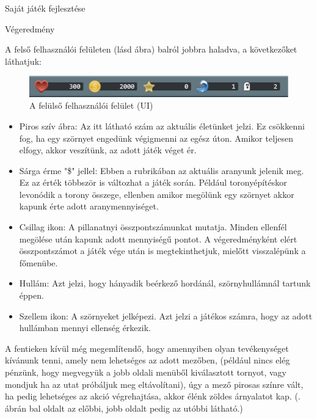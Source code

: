 \begin{MyChapter}{Saját játék fejlesztése}
\begin{MySection}{Végeredmény}
	
		A felső felhasználói felületen (lásd  ábra) balról jobbra haladva, a következőket láthatjuk:
		
		\begin{figure}[h!]
			\centering
			\includegraphics[scale=0.575]{kepek/jatekHasznalat/felso_ui}
			\caption{A felülső felhasználói felület (UI) }
			\label{fig:jatekHasznalat:felso_ui}
		\end{figure}
		
		\begin{itemize}
			\item Piros szív ábra: Az itt látható szám az aktuális életünket jelzi. Ez csökkenni fog, ha egy szörnyet engedünk végigmenni az egész úton. Amikor teljesen elfogy, akkor veszítünk, az adott játék véget ér.
			
			\item Sárga érme "\$" jellel: Ebben a rubrikában az aktuális aranyunk jelenik meg. Ez az érték többször is változhat a játék során. Például toronyépítéskor levonódik a torony összege, ellenben amikor megölünk egy szörnyet akkor kapunk érte adott aranymennyiséget.
			
			\item Csillag ikon: A pillanatnyi összpontszámunkat mutatja. Minden ellenfél megölése után kapunk adott mennyiségű pontot. A végeredményként elért összpontszámot a játék vége után is megtekinthetjuk, mielőtt visszalépünk a főmenübe.
			
			\item Hullám: Azt jelzi, hogy hányadik beérkező hordánál, szörnyhullámnál tartunk éppen.
			
			\item Szellem ikon: A szörnyeket jelképezi. Azt jelzi a játékos számra, hogy az adott hullámban mennyi ellenség érkezik.
		\end{itemize}
	
		A fentieken kívül még megemlítendő, hogy amennyiben olyan tevékenységet kívánunk tenni, amely nem lehetséges az adott mezőben, (például nincs elég pénzünk, hogy megvegyük a jobb oldali menüből kiválasztott tornyot, vagy mondjuk ha az utat próbáljuk meg eltávolítani), úgy a mező pirosas színre vált, ha pedig lehetséges az akció végrehajtása, akkor élénk zöldes árnyalatot kap. (. ábrán bal oldalt az előbbi, jobb oldalt pedig az utóbbi látható.)
		

\end{MySection}
\end{MyChapter}

